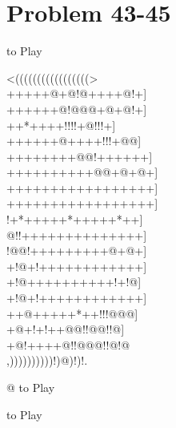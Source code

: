 \documentclass[mcrownvopaper,10pt,onecolumn,final]{memoir}
\begin{document}
\section{Problem 43-45}
\begin{minipage}[c]{0.5\linewidth}
    \hspace{8.3mm}
\end{minipage}
\begin{minipage}[c]{0.5\linewidth}
    \hspace{27mm}{\gnos%
        !
    }
    to Play
\end{minipage}
\begin{minipage}[c]{\linewidth}
    \centering
    {\gnos%
          <(((((((((((((((((>\\
    +++++@+@!@++++@!+]\\
    ++++++@!@@@+@+@!+]\\
    ++*++++!!!!+@!!!+]\\
    ++++++@++++!!!+@@]\\
    ++++++++@@!++++++]\\
    ++++++++++@@+@+@+]\\
    +++++++++++++++++]\\
    +++++++++++++++++]\\
    !+*+++++*+++++*++]\\
    @!!++++++++++++++]\\
    !@@!+++++++++@+@+]\\
    +!@+!++++++++++++]\\
    +!@++++++++++!+!@]\\
    +!@+!++++++++++++]\\
    ++@+++++*++!!!@@@]\\
    +@+!+!++@@!!@@!!@]\\
    +@!++++@!!@@@!!@!@\\
          ,))))))))))!)@)!)!.\\
    }
\end{minipage}
\begin{minipage}[c]{0.5\linewidth}
    \hspace{8.3mm} {\gnos%
        @  
    }
    to Play
\end{minipage}
\begin{minipage}[c]{0.5\linewidth}
    \hspace{27mm}{\gnos%
        !
    }
    to Play
\end{minipage}
\newpage
\end{document}
